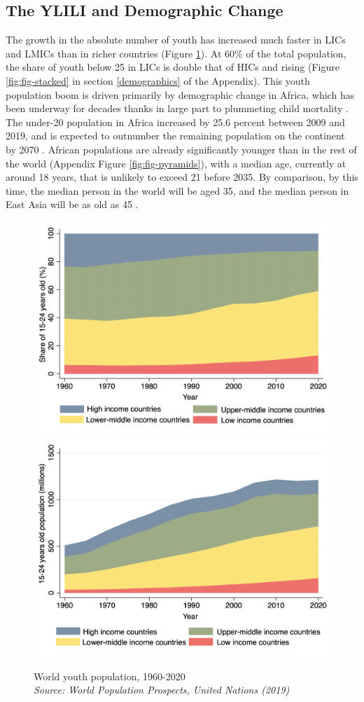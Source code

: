 \documentclass[
  a4paper, twoside, 12pt]{book}
\begin{document}
\hypertarget{the-ylili-and-demographic-change}{%
\subsection{The YLILI and Demographic Change}\label{the-ylili-and-demographic-change}}

The growth in the absolute number of youth has increased much faster in LICs and LMICs than in richer countries (Figure \ref{fig:fig-youthpop}). At 60\% of the total population, the share of youth below 25 in LICs is double that of HICs and rising (Figure \ref{fig:fig-stacked} in section \ref{demographics} of the Appendix). This youth population boom is driven primarily by demographic change in Africa, which has been underway for decades thanks in large part to plummeting child mortality \autocite{ortiz-ospina2016}. The under-20 population in Africa increased by 25.6 percent between 2009 and 2019, and is expected to outnumber the remaining population on the continent by 2070 \autocite{africandevelopmentbank2019}. African populations are already significantly younger than in the rest of the world (Appendix Figure \ref{fig:fig-pyramids}), with a median age, currently at around 18 years, that is unlikely to exceed 21 before 2035. By comparison, by this time, the median person in the world will be aged 35, and the median person in East Asia will be as old as 45 \autocite{filmer2014}.

\begin{figure}[H]

{\centering \includegraphics[width=0.49\linewidth,]{figures/relative_population} \includegraphics[width=0.49\linewidth,]{figures/total_population} 

}

\caption[World youth population, 1960-2020]{World youth population, 1960-2020 \\ \textit{\footnotesize{Source: World Population Prospects, United Nations (2019)}}}\label{fig:fig-youthpop}
\end{figure}
\end{document}
